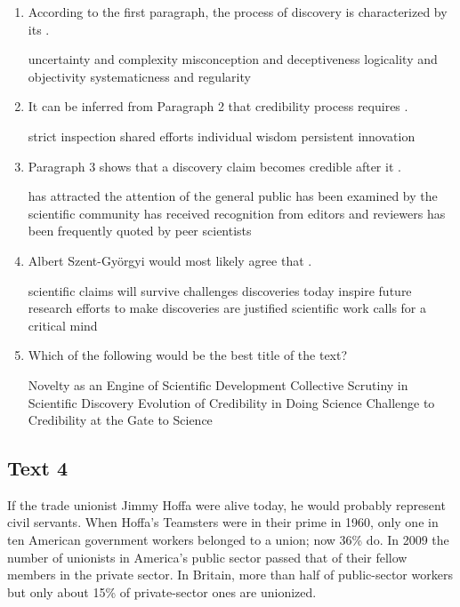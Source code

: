 \begin{enumerate}[resume]
	\item
According to the first paragraph, the process of discovery
is characterized by its \lineread.


\fourchoices
{uncertainty and complexity}
{misconception and deceptiveness}
{logicality and objectivity}
{systematicness and regularity}


\item
It can be inferred from Paragraph 2 that credibility process
requires \lineread.


\fourchoices
{strict inspection}
{shared efforts}
{individual wisdom}
{persistent innovation}



\item
Paragraph 3 shows that a discovery claim becomes credible
after it \lineread.


\fourchoices
{has attracted the attention of the general public}
{has been examined by the scientific community}
{has received recognition from editors and reviewers}
{has been frequently quoted by peer scientists}


\item
Albert Szent-Györgyi would most likely agree that \lineread.


\fourchoices
{scientific claims will survive challenges}
{discoveries today inspire future research}
{efforts to make discoveries are justified}
{scientific work calls for a critical mind}


\item
Which of the following would be the best title of the text?


\fourchoices
{Novelty as an Engine of Scientific Development}
{Collective Scrutiny in Scientific Discovery}
{Evolution of Credibility in Doing Science}
{Challenge to Credibility at the Gate to Science}

\end{enumerate}


\newpage
\subsection{Text 4}


If the trade unionist Jimmy Hoffa were alive today, he would probably
represent civil servants. When Hoffa's Teamsters were in their prime in
1960, only one in ten American government workers belonged to a union;
now 36\% do. In 2009 the number of unionists in America's public sector
passed that of their fellow members in the private sector. In Britain,
more than half of public-sector workers but only about 15\% of
private-sector ones are unionized.

